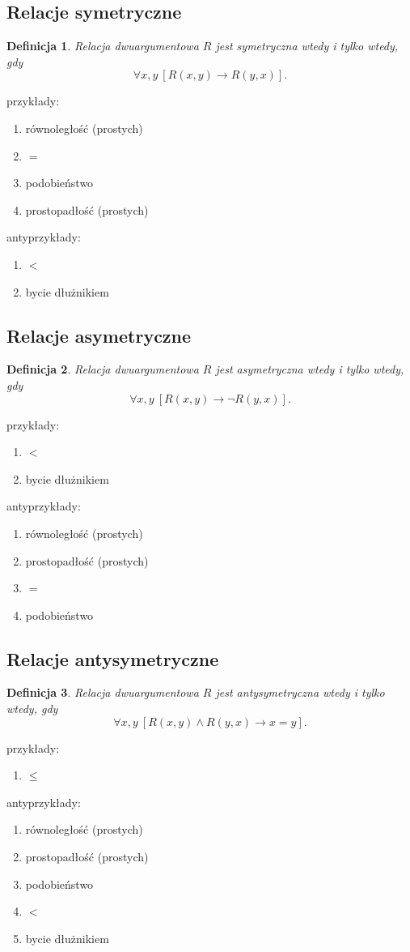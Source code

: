 \documentclass[12pt]{article}
\newtheorem{definicja}{Definicja}
\begin{document}
\subsection{Relacje symetryczne}
%
\begin{definicja}
Relacja dwuargumentowa $R$ jest \emph{symetryczna} wtedy i tylko wtedy, gdy $$\forall x,y ~[R(x,y) \to R(y, x)].$$
\end{definicja}
%
przykłady:
\begin{enumerate}
\item równoległość (prostych)
\item $=$
\item podobieństwo
\item prostopadłość (prostych)
\end{enumerate}
%
antyprzykłady:
\begin{enumerate}
\item $<$
\item bycie dłużnikiem
\end{enumerate}
%

\subsection{Relacje asymetryczne}
%
\begin{definicja}
Relacja dwuargumentowa $R$ jest \emph{asymetryczna} wtedy i tylko wtedy, gdy $$\forall x,y ~[R(x,y) \to \neg R(y, x)].$$
\end{definicja}
%
przykłady:
\begin{enumerate}
\item $<$
\item bycie dłużnikiem
\end{enumerate}
%
antyprzykłady:
\begin{enumerate}
\item równoległość (prostych)
\item prostopadłość (prostych)
\item $=$
\item podobieństwo
\end{enumerate}
%

\subsection{Relacje antysymetryczne}
%
\begin{definicja}
Relacja dwuargumentowa $R$ jest \emph{antysymetryczna} wtedy i tylko wtedy, gdy $$\forall x,y ~[R(x,y) \land R(y, x) \to x=y].$$
\end{definicja}
%
przykłady:
\begin{enumerate}
\item $\leq$
\end{enumerate}
%
antyprzykłady:
\begin{enumerate}
\item równoległość (prostych)
\item prostopadłość (prostych)
\item podobieństwo
\item $<$
\item bycie dłużnikiem
\end{enumerate}
%
\end{document}
